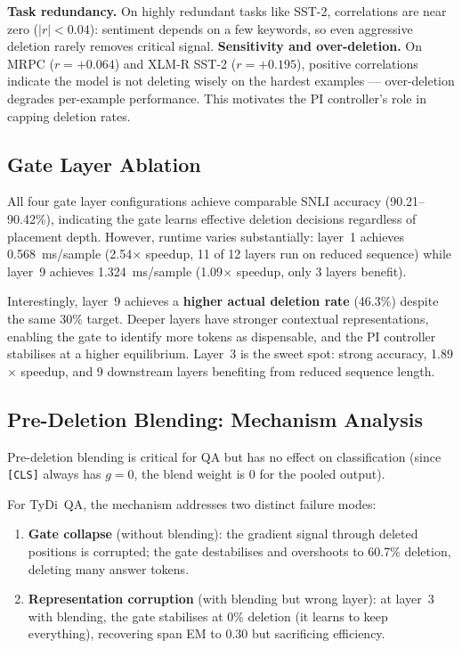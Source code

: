 \documentclass[11pt,a4paper]{article}
\begin{document}
\textbf{Task redundancy.} On highly redundant tasks like SST-2, correlations are near zero ($|r|<0.04$): sentiment depends on a few keywords, so even aggressive deletion rarely removes critical signal. \textbf{Sensitivity and over-deletion.} On MRPC ($r=+0.064$) and XLM-R SST-2 ($r=+0.195$), positive correlations indicate the model is not deleting wisely on the hardest examples --- over-deletion degrades per-example performance. This motivates the PI controller's role in capping deletion rates.


\subsection{Gate Layer Ablation}

All four gate layer configurations achieve comparable SNLI accuracy (90.21--90.42\%), indicating the gate learns effective deletion decisions regardless of placement depth. However, runtime varies substantially: layer~1 achieves 0.568~ms/sample (2.54$\times$ speedup, 11 of 12 layers run on reduced sequence) while layer~9 achieves 1.324~ms/sample (1.09$\times$ speedup, only 3 layers benefit).

Interestingly, layer~9 achieves a \textbf{higher actual deletion rate} (46.3\%) despite the same 30\% target. Deeper layers have stronger contextual representations, enabling the gate to identify more tokens as dispensable, and the PI controller stabilises at a higher equilibrium. Layer~3 is the sweet spot: strong accuracy, 1.89$\times$ speedup, and 9 downstream layers benefiting from reduced sequence length.


\subsection{Pre-Deletion Blending: Mechanism Analysis}

Pre-deletion blending is critical for QA but has no effect on classification (since \texttt{[CLS]} always has $g=0$, the blend weight is 0 for the pooled output).

For TyDi~QA, the mechanism addresses two distinct failure modes:
\begin{enumerate}[nosep]
    \item \textbf{Gate collapse} (without blending): the gradient signal through deleted positions is corrupted; the gate destabilises and overshoots to 60.7\% deletion, deleting many answer tokens.
    \item \textbf{Representation corruption} (with blending but wrong layer): at layer~3 with blending, the gate stabilises at 0\% deletion (it learns to keep everything), recovering span EM to 0.30 but sacrificing efficiency.
\end{enumerate}
\end{document}
